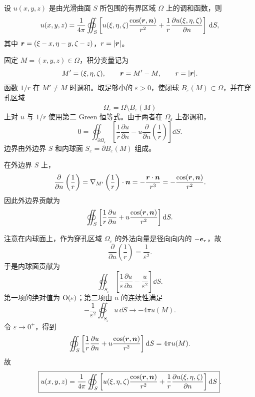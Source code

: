 \begin{xreferenceproblem}[4]
设 $u(x,y,z)$ 是由光滑曲面 $S$ 所包围的有界区域 $\Omega$ 上的调和函数，则
\[
  u(x,y,z)=\frac{1}{4\pi}\oiint_S\left[
  u(\xi,\eta,\zeta)\frac{\cos(\bm{r},\bm{n})}{r^2}
  +\frac{1}{r}\frac{\partial u(\xi,\eta,\zeta)}{\partial n}
  \right]\,\mathop{}\!\mathrm{d} S,
\]
其中 $\bm{r}=(\xi-x,\eta-y,\zeta-z)$，$r=\lvert\bm{r}\rvert$。
\end{xreferenceproblem}
\begin{xsolution}
固定 $M=(x,y,z)\in\Omega$，积分变量记为
\[
  M'=(\xi,\eta,\zeta),
  \qquad
  \bm{r}=M'-M,
  \qquad
  r=\lvert\bm{r}\rvert.
\]
函数 $1/r$ 在 $M'\ne M$ 时调和。取足够小的 $\varepsilon>0$，使闭球 $\overline{B_\varepsilon(M)}\subset\Omega$，并在穿孔区域
\[
  \Omega_\varepsilon=\Omega\setminus\overline{B_\varepsilon(M)}
\]
上对 $u$ 与 $1/r$ 使用第二 Green 恒等式。由于两者在 $\Omega_\varepsilon$ 上都调和，
\[
  0=\oiint_{\partial\Omega_\varepsilon}\left[
  \frac1r\frac{\partial u}{\partial n}
  -u\frac{\partial}{\partial n}\left(\frac1r\right)
  \right]\dd S.
\]
边界由外边界 $S$ 和内球面 $S_\varepsilon=\partial B_\varepsilon(M)$ 组成。

在外边界 $S$ 上，
\[
  \frac{\partial}{\partial n}\left(\frac1r\right)
  =\nabla_{M'}\left(\frac1r\right)\cdot\bm{n}
  =-\frac{\bm{r}\cdot\bm{n}}{r^3}
  =-\frac{\cos(\bm{r},\bm{n})}{r^2}.
\]
因此外边界贡献为
\[
  \oiint_S\left[
  \frac1r\frac{\partial u}{\partial n}
  +u\frac{\cos(\bm{r},\bm{n})}{r^2}
  \right]\mathop{}\!\mathrm{d} S.
\]

注意在内球面上，作为穿孔区域 $\Omega_\varepsilon$ 的外法向量是径向向内的 $-\bm{e}_r$，故
\[
  \frac{\partial}{\partial n}\left(\frac1r\right)=\frac1{\varepsilon^2}.
\]
于是内球面贡献为
\[
  \oiint_{S_\varepsilon}\left[
  \frac1\varepsilon\frac{\partial u}{\partial n}
  -\frac{u}{\varepsilon^2}
  \right]\dd S.
\]
第一项的绝对值为 $\mathrm{O}(\varepsilon)$；第二项由 $u$ 的连续性满足
\[
  -\frac1{\varepsilon^2}\oiint_{S_\varepsilon}u\,\dd S
  \longrightarrow-4\pi u(M).
\]
令 $\varepsilon\to0^+$，得到
\[
  \oiint_S\left[
  \frac1r\frac{\partial u}{\partial n}
  +u\frac{\cos(\bm{r},\bm{n})}{r^2}
  \right]\mathop{}\!\mathrm{d} S
  =4\pi u(M).
\]
故
\[
  \boxed{
  u(x,y,z)=\frac1{4\pi}\oiint_S\left[
  u(\xi,\eta,\zeta)\frac{\cos(\bm{r},\bm{n})}{r^2}
  +\frac1r\frac{\partial u(\xi,\eta,\zeta)}{\partial n}
  \right]\mathop{}\!\mathrm{d} S
  }.
\]
\end{xsolution}


